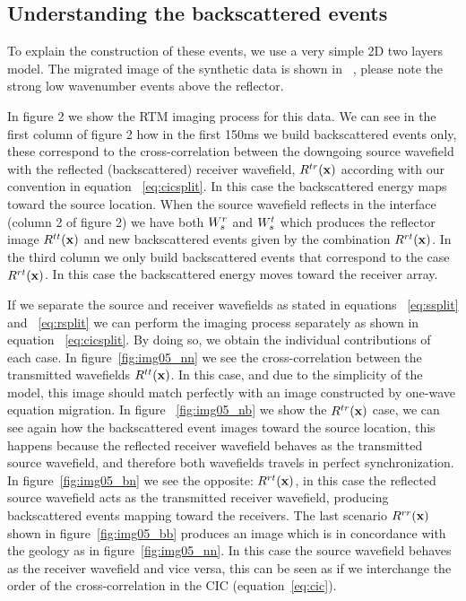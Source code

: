 \subsection{Understanding the backscattered events}

To explain the construction of these events, we use a very simple 2D two layers model. The migrated image of the synthetic
data is shown in ~, please note the strong low wavenumber events above the reflector. 

In figure 2 we show the RTM imaging process for this data. We can see in the first column of figure 2 how in the first
 150ms we build backscattered events only, these correspond to the cross-correlation between the downgoing source wavefield
 with the reflected (backscattered) receiver wavefield, $R^{tr}({\bf x})$ according with our convention in 
 equation ~\ref{eq:cicsplit}. In this case the backscattered energy maps toward the source location. When 
the source wavefield reflects in the interface (column 2 of figure 2) we have  both ${W_s^r}$ and ${W_s^t}$ which produces 
the reflector image $R^{tt}({\bf x})$ and new backscattered events given by the combination $R^{rt}({\bf x})$. In the third 
column we only build backscattered events that correspond to the case $R^{rt}({\bf x})$.
 In this case the backscattered energy moves toward the receiver array.

If we separate the source and receiver wavefields as stated in equations ~\ref{eq:ssplit} and ~\ref{eq:rsplit} we can perform
the imaging process separately as shown in equation ~\ref{eq:cicsplit}. By doing so, we obtain the individual contributions of each
case. In figure~\ref{fig:img05_nn} we see the cross-correlation between the transmitted wavefields $R^{tt}({\bf x})$. In 
this case, and due to the simplicity of the model, this image should match perfectly with an image constructed by one-wave
equation migration. In figure ~\ref{fig:img05_nb} we show the  $R^{tr}({\bf x})$ case, we can see again how the 
backscattered event images toward the source  location, this happens because the reflected receiver wavefield behaves
 as the transmitted source wavefield, and therefore both wavefields travels in perfect synchronization. In figure~\ref{fig:img05_bn}
we see the opposite: $R^{rt}({\bf x})$, in this case the reflected source wavefield acts as the transmitted receiver
wavefield, producing backscattered events mapping toward the receivers. The last scenario $R^{rr}({\bf x})$ shown
in figure~\ref{fig:img05_bb} produces an image which is in concordance with the geology as in figure~\ref{fig:img05_nn}. In this
case the source wavefield behaves as the receiver wavefield and vice versa, this can be seen as if we interchange the
order of the cross-correlation in the CIC (equation~\ref{eq:cic}).

